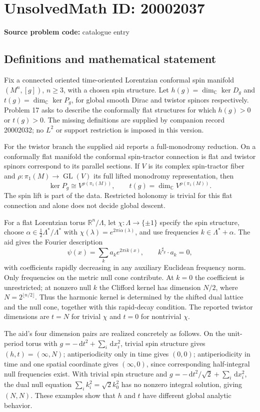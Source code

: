 \documentclass[11pt]{article}
\newcommand{\R}{\mathbb{R}}
\newcommand{\C}{\mathbb{C}}
\newcommand{\dd}{\,\mathrm{d}}
\begin{document}
\section*{UnsolvedMath ID: 20002037}
\textbf{Source problem code:} catalogue entry
\subsection{Definitions and mathematical statement}
Fix a connected oriented time-oriented Lorentzian conformal spin manifold \((M^n,[g])\), \(n\geq3\), with a chosen spin structure. Let \(h(g)=\dim_\C\ker D_g\) and \(t(g)=\dim_\C\ker P_g\), for global smooth Dirac and twistor spinors respectively. Problem 17 asks to describe the conformally flat structures for which \(h(g)>0\) or \(t(g)>0\). The missing definitions are supplied by companion record 20002032; no \(L^2\) or support restriction is imposed in this version.

For the twistor branch the supplied aid reports a full-monodromy reduction. On a conformally flat manifold the conformal spin-tractor connection is flat and twistor spinors correspond to its parallel sections. If \(V\) is its complex spin-tractor fiber and \(\rho:\pi_1(M)\to\operatorname{GL}(V)\) its full lifted monodromy representation, then
\[
\ker P_g\cong V^{\rho(\pi_1(M))},\qquad
t(g)=\dim_\C V^{\rho(\pi_1(M))}.
\]
The spin lift is part of the data. Restricted holonomy is trivial for this flat connection and alone does not decide global descent.

For a flat Lorentzian torus \(\R^n/\Lambda\), let \(\chi:\Lambda\to\{\pm1\}\) specify the spin structure, choose \(\alpha\in\tfrac12\Lambda^*/\Lambda^*\) with \(\chi(\lambda)=e^{2\pi i\alpha(\lambda)}\), and use frequencies \(k\in\Lambda^*+\alpha\). The aid gives the Fourier description
\[
\psi(x)=\sum_k a_ke^{2\pi i k(x)},\qquad
k^{\sharp_g}\cdot a_k=0,
\]
with coefficients rapidly decreasing in any auxiliary Euclidean frequency norm. Only frequencies on the metric null cone contribute. At \(k=0\) the coefficient is unrestricted; at nonzero null \(k\) the Clifford kernel has dimension \(N/2\), where \(N=2^{\lfloor n/2\rfloor}\). Thus the harmonic kernel is determined by the shifted dual lattice and the null cone, together with this rapid-decay condition. The reported twistor dimensions are \(t=N\) for trivial \(\chi\) and \(t=0\) for nontrivial \(\chi\).

The aid's four dimension pairs are realized concretely as follows. On the unit-period torus with \(g=-\dd t^2+\sum_i\dd x_i^2\), trivial spin structure gives \((h,t)=(\infty,N)\); antiperiodicity only in time gives \((0,0)\); antiperiodicity in time and one spatial coordinate gives \((\infty,0)\), since corresponding half-integral null frequencies exist. With trivial spin structure and \(g=-\dd t^2/\sqrt2+\sum_i\dd x_i^2\), the dual null equation \(\sum_i k_i^2=\sqrt2 k_0^2\) has no nonzero integral solution, giving \((N,N)\). These examples show that \(h\) and \(t\) have different global analytic behavior.
\end{document}
